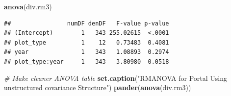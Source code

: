 \documentclass[]{article}
\newenvironment{Shaded}{\begin{snugshade}}{\end{snugshade}}
\newcommand{\KeywordTok}[1]{\textcolor[rgb]{0.13,0.29,0.53}{\textbf{{#1}}}}
\newcommand{\StringTok}[1]{\textcolor[rgb]{0.31,0.60,0.02}{{#1}}}
\newcommand{\CommentTok}[1]{\textcolor[rgb]{0.56,0.35,0.01}{\textit{{#1}}}}
\newcommand{\NormalTok}[1]{{#1}}
\begin{document}
\begin{Shaded}
\begin{Highlighting}[]
\KeywordTok{anova}\NormalTok{(div.rm3)}
\end{Highlighting}
\end{Shaded}

\begin{verbatim}
##                numDF denDF   F-value p-value
## (Intercept)        1   343 255.02615  <.0001
## plot_type          1    12   0.73483  0.4081
## year               1   343   1.08893  0.2974
## plot_type:year     1   343   3.80980  0.0518
\end{verbatim}

\begin{Shaded}
\begin{Highlighting}[]
\CommentTok{# Make cleaner ANOVA table}
\KeywordTok{set.caption}\NormalTok{(}\StringTok{"RMANOVA for Portal Using unstructured covariance Structure"}\NormalTok{) }
\KeywordTok{pander}\NormalTok{(}\KeywordTok{anova}\NormalTok{(div.rm3))}
\end{Highlighting}
\end{Shaded}
\end{document}
